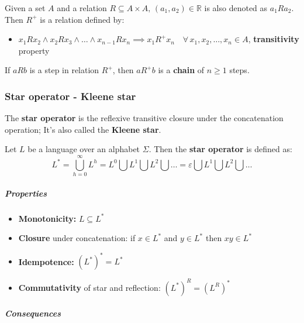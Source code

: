 \documentclass[english]{article}
\begin{document}
\begin{definition}
  Given a set \(A\) and a relation \(R \subseteq A \times A, \, (a_1, a_2) \in \mathbb{R}\) is also denoted as \(a_1 R a_2\).
  Then \(R^+\) is a relation defined by:

  \begin{itemize}
    \item \(x_1 R x_2 \land x_2 R x_3 \land \ldots \land x_{n-1} R x_n \implies x_1 R^+ x_n \quad \forall \, x_1, x_2, \ldots, x_n \in A\), \textbf{transitivity} property
  \end{itemize}

  If \(a R b\) is a step in relation \(R^+\), then \(a R^+ b\) is a \textbf{chain} of \(n \geq 1\) steps.
\end{definition}

\subsubsection{Star operator - Kleene star}

The \textbf{star operator} is the reflexive transitive closure under the concatenation operation;
It's also called the \textbf{Kleene star}.

\begin{definition}
  Let \(L\) be a language over an alphabet \(\Sigma\).
  Then the \textbf{star operator} is defined as:
  \[ L^\ast = \bigcup_{h=0}^{\infty} L^h = L^0 \bigcup L^1 \bigcup L^2 \bigcup \ldots = \varepsilon \bigcup L^1 \bigcup L^2
    \bigcup \ldots \]
\end{definition}

\subparagraph*{Properties}

\begin{itemize}
  \item \textbf{Monotonicity:} \(L \subseteq L^\ast\)
  \item \textbf{Closure} under concatenation: if \(x \in L^\ast\) and \(y \in L^\ast\) then \(xy \in L^\ast\)
  \item \textbf{Idempotence:} \(\left(L^\ast\right)^\ast = L^\ast\)
  \item \textbf{Commutativity} of star and reflection: \(\left(L^\ast\right)^R = \left(L^R\right)^\ast\)

\end{itemize}

\subparagraph*{Consequences}
\end{document}
